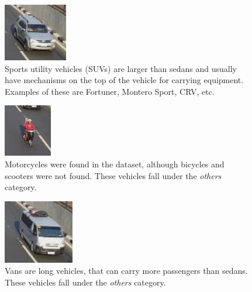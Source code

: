 \documentclass[conference]{IEEEtran}
\begin{document}
\begin{figure}[!h]
\centering
\includegraphics{vehicle_suv.png}
\caption{Sports utility vehicles (SUVs) are larger than sedans and usually have mechanisms on the top of the vehicle for carrying equipment. Examples of these are Fortuner, Montero Sport, CRV, etc.}
\label{fig_suv}
\end{figure}

\begin{figure}[!h]
\centering
\includegraphics{vehicle_motorcycle.png}
\caption{Motorcycles were found in the dataset, although bicycles and scooters were not found. These vehicles fall under the \textit{others} category.}
\label{fig_motorcycle}
\end{figure}


\begin{figure}[!h]
\centering
\includegraphics{vehicle_van.png}
\caption{Vans are long vehicles, that can carry more passengers than sedans. These vehicles fall under the \textit{others} category.}
\label{fig_van}
\end{figure}
\end{document}
